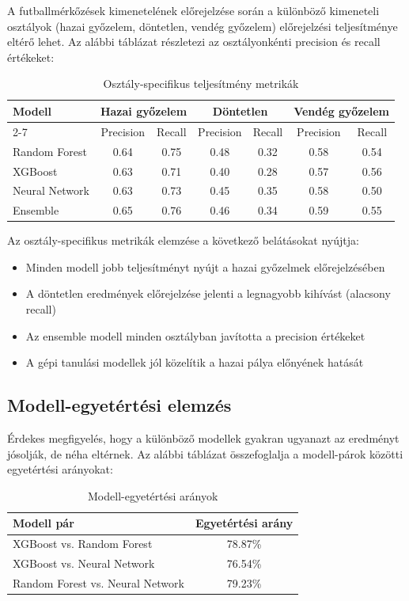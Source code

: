 A futballmérkőzések kimenetelének előrejelzése során a különböző kimeneteli osztályok (hazai győzelem, döntetlen, vendég győzelem) előrejelzési teljesítménye eltérő lehet. Az alábbi táblázat részletezi az osztályonkénti precision és recall értékeket:

\begin{table}[h]
\centering
\begin{tabular}{|l|c|c|c|c|c|c|}
\hline
\multirow{2}{*}{\textbf{Modell}} & \multicolumn{2}{c|}{\textbf{Hazai győzelem}} & \multicolumn{2}{c|}{\textbf{Döntetlen}} & \multicolumn{2}{c|}{\textbf{Vendég győzelem}} \\
\cline{2-7}
 & Precision & Recall & Precision & Recall & Precision & Recall \\
\hline
Random Forest & 0.64 & 0.75 & 0.48 & 0.32 & 0.58 & 0.54 \\
XGBoost & 0.63 & 0.71 & 0.40 & 0.28 & 0.57 & 0.56 \\
Neural Network & 0.63 & 0.73 & 0.45 & 0.35 & 0.58 & 0.50 \\
Ensemble & 0.65 & 0.76 & 0.46 & 0.34 & 0.59 & 0.55 \\
\hline
\end{tabular}
\caption{Osztály-specifikus teljesítmény metrikák}
\label{tab:class-specific-metrics}
\end{table}

Az osztály-specifikus metrikák elemzése a következő belátásokat nyújtja:
\begin{itemize}
    \item Minden modell jobb teljesítményt nyújt a hazai győzelmek előrejelzésében
    \item A döntetlen eredmények előrejelzése jelenti a legnagyobb kihívást (alacsony recall)
    \item Az ensemble modell minden osztályban javította a precision értékeket
    \item A gépi tanulási modellek jól közelítik a hazai pálya előnyének hatását
\end{itemize}

\subsection{Modell-egyetértési elemzés}

Érdekes megfigyelés, hogy a különböző modellek gyakran ugyanazt az eredményt jósolják, de néha eltérnek. Az alábbi táblázat összefoglalja a modell-párok közötti egyetértési arányokat:

\begin{table}[h]
\centering
\begin{tabular}{|l|c|}
\hline
\textbf{Modell pár} & \textbf{Egyetértési arány} \\
\hline
XGBoost vs. Random Forest & 78.87\% \\
XGBoost vs. Neural Network & 76.54\% \\
Random Forest vs. Neural Network & 79.23\% \\
\hline
\end{tabular}
\caption{Modell-egyetértési arányok}
\label{tab:model-agreement}
\end{table}

